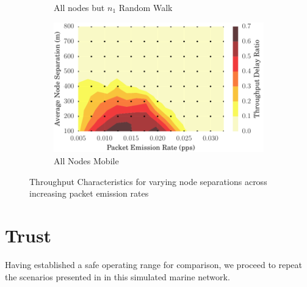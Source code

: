 \documentclass[runningheads,a4paper]{llncs}
\begin{document}
\begin{figure}
\begin{subfigure}{.5\textwidth}
  \caption{All nodes but $n_1$ Random Walk}
  \label{fig:throughput_allbut1}
\end{subfigure}
\begin{subfigure}{.5\textwidth}
\centering
  \includegraphics[width=.9\linewidth]{img/2d_ratio_all_mobile.pdf}
  \caption{All Nodes Mobile}
  \label{fig:throughput_all_mobile}
\end{subfigure}
\caption{Throughput Characteristics for varying node separations across increasing packet emission rates}
\label{fig:scenario_througputs_plain}
\end{figure}



\section{Trust}\label{sec:trustresultsanddiscussion}

Having established a safe operating range for comparison, we proceed to repeat the scenarios presented in \cite{Guo11} in this simulated marine network.
\end{document}
